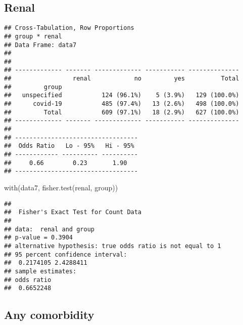 \documentclass[
]{article}
\newenvironment{Shaded}{\begin{snugshade}}{\end{snugshade}}
\newcommand{\AttributeTok}[1]{\textcolor[rgb]{0.77,0.63,0.00}{#1}}
\newcommand{\ConstantTok}[1]{\textcolor[rgb]{0.00,0.00,0.00}{#1}}
\newcommand{\FunctionTok}[1]{\textcolor[rgb]{0.00,0.00,0.00}{#1}}
\newcommand{\NormalTok}[1]{#1}
\newcommand{\SpecialCharTok}[1]{\textcolor[rgb]{0.00,0.00,0.00}{#1}}
\newcommand{\StringTok}[1]{\textcolor[rgb]{0.31,0.60,0.02}{#1}}
\begin{document}
\hypertarget{renal}{%
\subsection{Renal}\label{renal}}

\begin{Shaded}
\end{Shaded}

\begin{verbatim}
## Cross-Tabulation, Row Proportions  
## group * renal  
## Data Frame: data7  
## 
## 
## ------------- ------- ------------- ----------- --------------
##                 renal            no         yes          Total
##         group                                                 
##   unspecified           124 (96.1%)    5 (3.9%)   129 (100.0%)
##      covid-19           485 (97.4%)   13 (2.6%)   498 (100.0%)
##         Total           609 (97.1%)   18 (2.9%)   627 (100.0%)
## ------------- ------- ------------- ----------- --------------
## 
## ----------------------------------
##  Odds Ratio   Lo - 95%   Hi - 95% 
## ------------ ---------- ----------
##     0.66        0.23       1.90   
## ----------------------------------
\end{verbatim}

\begin{Shaded}
\begin{Highlighting}[]
\FunctionTok{with}\NormalTok{(data7, }\FunctionTok{fisher.test}\NormalTok{(renal, group))}
\end{Highlighting}
\end{Shaded}

\begin{verbatim}
## 
##  Fisher's Exact Test for Count Data
## 
## data:  renal and group
## p-value = 0.3904
## alternative hypothesis: true odds ratio is not equal to 1
## 95 percent confidence interval:
##  0.2174105 2.4288411
## sample estimates:
## odds ratio 
##  0.6652248
\end{verbatim}

\hypertarget{any-comorbidity}{%
\subsection{Any comorbidity}\label{any-comorbidity}}
\end{document}

